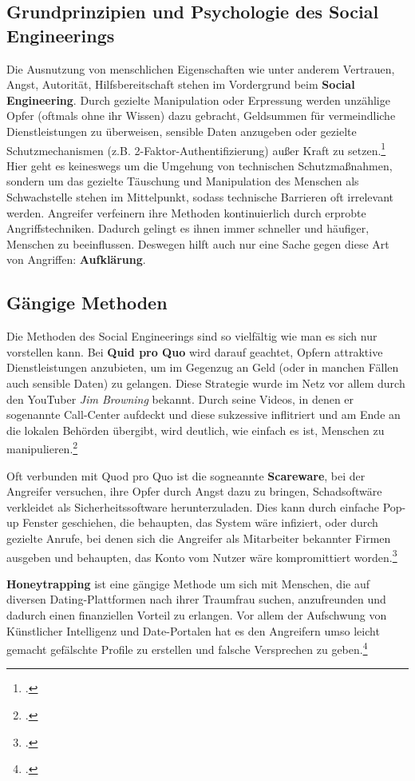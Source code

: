 \documentclass[12pt, a4paper, oneside]{scrartcl}
\begin{document}
\subsection{Grundprinzipien und Psychologie des Social Engineerings}
Die Ausnutzung von menschlichen Eigenschaften wie unter anderem Vertrauen, Angst, Autorität, Hilfsbereitschaft 
stehen im Vordergrund beim \textbf{Social Engineering}. Durch gezielte Manipulation
oder Erpressung werden unzählige Opfer (oftmals ohne ihr Wissen) dazu gebracht, Geldsummen
für vermeindliche Dienstleistungen zu überweisen, sensible Daten anzugeben oder gezielte Schutzmechanismen
(z.B. 2-Faktor-Authentifizierung) außer Kraft zu setzen.\footcite{BSISocialEngineering}\\
Hier geht es keineswegs um die Umgehung von technischen Schutzmaßnahmen, sondern um das gezielte
Täuschung und Manipulation des Menschen als Schwachstelle stehen im Mittelpunkt, sodass technische Barrieren 
oft irrelevant werden. Angreifer verfeinern ihre Methoden kontinuierlich durch erprobte Angriffstechniken. 
Dadurch gelingt es ihnen immer schneller und häufiger, Menschen zu beeinflussen.
Deswegen hilft auch nur eine Sache gegen diese Art von Angriffen: \textbf{Aufklärung}.

\subsection{Gängige Methoden}
\par
Die Methoden des Social Engineerings sind so vielfältig wie man es sich nur vorstellen kann.
Bei \textbf{Quid pro Quo} wird darauf geachtet, Opfern attraktive Dienstleistungen anzubieten, um im Gegenzug
an Geld (oder in manchen Fällen auch sensible Daten) zu gelangen. Diese Strategie wurde im Netz vor allem durch den YouTuber \textit{Jim Browning} bekannt.
Durch seine Videos, in denen er sogenannte Call-Center aufdeckt und diese sukzessive inflitriert und
am Ende an die lokalen Behörden übergibt, wird deutlich, wie einfach es ist, Menschen zu manipulieren.\footcite{JB_YouTube}
\par
Oft verbunden mit Quod pro Quo ist die sogneannte \textbf{Scareware}, bei der Angreifer versuchen, ihre Opfer 
durch Angst dazu zu bringen, Schadsoftwäre verkleidet als Sicherheitssoftware herunterzuladen. Dies kann 
durch einfache Pop-up Fenster geschiehen, die behaupten, das System wäre infiziert, oder durch gezielte
Anrufe, bei denen sich die Angreifer als Mitarbeiter bekannter Firmen ausgeben und behaupten, das Konto
vom Nutzer wäre kompromittiert worden.\footcite{Keeper_Scareware}
\par
\textbf{Honeytrapping} ist eine gängige Methode um sich mit Menschen, die auf diversen Dating-Plattformen nach
ihrer Traumfrau suchen, anzufreunden und dadurch einen finanziellen Vorteil zu erlangen. Vor allem 
der Aufschwung von Künstlicher Intelligenz und Date-Portalen hat es den Angreifern umso leicht gemacht
gefälschte Profile zu erstellen und falsche Versprechen zu geben.\footcite{CS_10Arten}\\
\end{document}
